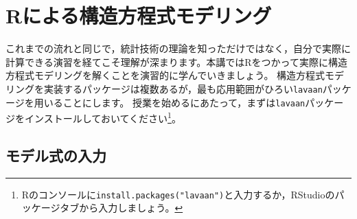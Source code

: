 \documentclass{ltjsbook}
\begin{document}
 
\VerbatimFootnotes
\chapter{Rによる構造方程式モデリング}
\label{chapter13} 

これまでの流れと同じで，統計技術の理論を知っただけではなく，自分で実際に計算できる演習を経てこそ理解が深まります。本講ではRをつかって実際に構造方程式モデリングを解くことを演習的に学んでいきましょう。
構造方程式モデリングを実装するパッケージは複数あるが，最も応用範囲がひろい\texttt{lavaan}パッケージを用いることにします。
授業を始めるにあたって，まずは\texttt{lavaan}パッケージをインストールしておいてください\footnote{Rのコンソールに\verb|install.packages("lavaan")|と入力するか，RStudioのパッケージタブから入力しましょう。}。

\section{モデル式の入力}
\end{document}
